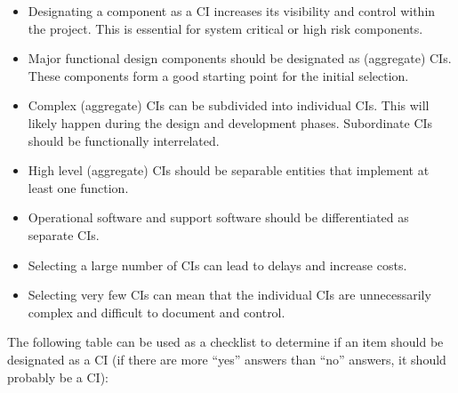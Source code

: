 \documentclass{template/openetcs_report}
\begin{document}
\vspace{-10pt}
\begin{itemize}
\item Designating a component as a CI increases its visibility and control within the project. This is essential for system critical or high risk components.
\item Major functional design components should be designated as (aggregate) CIs. These components form a good starting point for the initial selection.
\item Complex (aggregate) CIs can be subdivided into individual CIs. This will likely happen during the design and development phases. Subordinate CIs should be functionally interrelated.
\item High level (aggregate) CIs should be separable entities that implement at least one function.
\item Operational software and support software should be differentiated as separate CIs.
\item Selecting a large number of CIs can lead to delays and increase costs.
\item Selecting very few CIs can mean that the individual CIs are unnecessarily complex and difficult to document and control. 
\end{itemize}

The following table can be used as a checklist to determine if an item should be designated as a CI (if there are more “yes” answers than “no” answers, it should probably be a CI):
\end{document}
